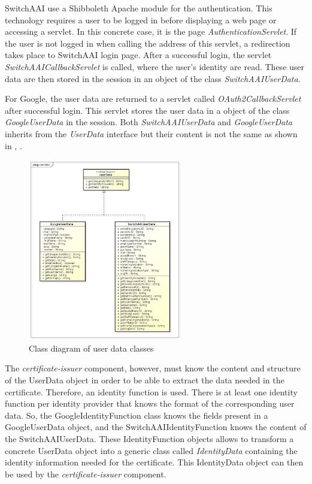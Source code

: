 \documentclass[oneside]{scrreprt}
\begin{document}
SwitchAAI use a Shibboleth Apache module for the authentication. This technology requires a user to be logged in before displaying a web page or accessing a servlet. In this concrete case, it is the page \textit{AuthenticationServlet}. If the user is not logged in when calling the address of this servlet, a redirection takes place to SwitchAAI login page. After a successful login, the servlet \textit{SwitchAAICallbackServlet} is called, where the user's identity are read. These user data are then stored in the session in an object of the class \textit{SwitchAAIUserData}.

For Google, the user data are returned to a servlet called \textit{OAuth2CallbackServlet} after successful login. This servlet stores the user data in a object of the class \textit{GoogleUserData} in the session. Both \textit{SwitchAAIUserData} and \textit{GoogleUserData} inherits from the \textit{UserData} interface but their content is not the same as shown in , .

\begin{figure}[ht]
\centerline{
\includegraphics[width=0.6\textwidth]{figs/userdata_class_diagram.png}}
\caption{Class diagram of user data classes}
\label{fig:userdata}
\end{figure}

The \textit{certificate-issuer} component, however, must know the content and structure of the UserData object in order to be able to extract the data needed in the certificate. Therefore, an identity function is used. There is at least one identity function per identity provider that knows the format of the corresponding user data. So, the GoogleIdentityFunction class knows the fields present in a GoogleUserData object, and the SwitchAAIIdentityFunction knows the content of the SwitchAAIUserData. These IdentityFunction objects allows to transform a concrete UserData object into a generic class called \textit{IdentityData} containing the identity information needed for the certificate. This IdentityData object can then be used by the \textit{certificate-issuer} component.
\end{document}
